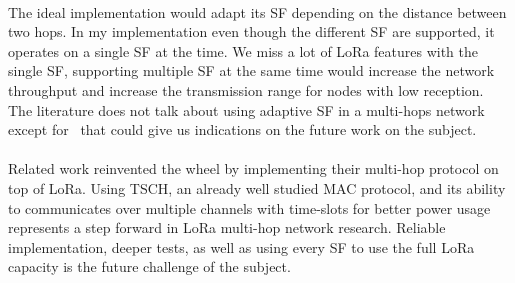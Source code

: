 \documentclass[11pt]{report}
\begin{document}
\paragraph{}

The ideal implementation would adapt its SF depending on the distance
between two hops.
In my implementation even though the different SF are supported, it operates
on a single SF at the time. 
We miss a lot of LoRa features with the single SF, supporting multiple SF at
the same time would increase the network throughput and increase the
transmission range for nodes with low reception.
The literature does not talk about using adaptive SF in a multi-hops
network except for~\cite{8115756} that could give us indications on the future
work on the subject.

\paragraph{}

Related work reinvented the wheel by implementing their multi-hop protocol
on top of LoRa.
Using TSCH, an already well studied MAC protocol, and its ability to
communicates over multiple channels with time-slots for better power usage 
represents a step forward in LoRa multi-hop network research.
Reliable implementation, deeper tests, as well as using every SF to use the full 
LoRa capacity is the future challenge of the subject.

\newpage

\printbibliography

\newpage

\begin{appendices}

\end{appendices}
\end{document}
